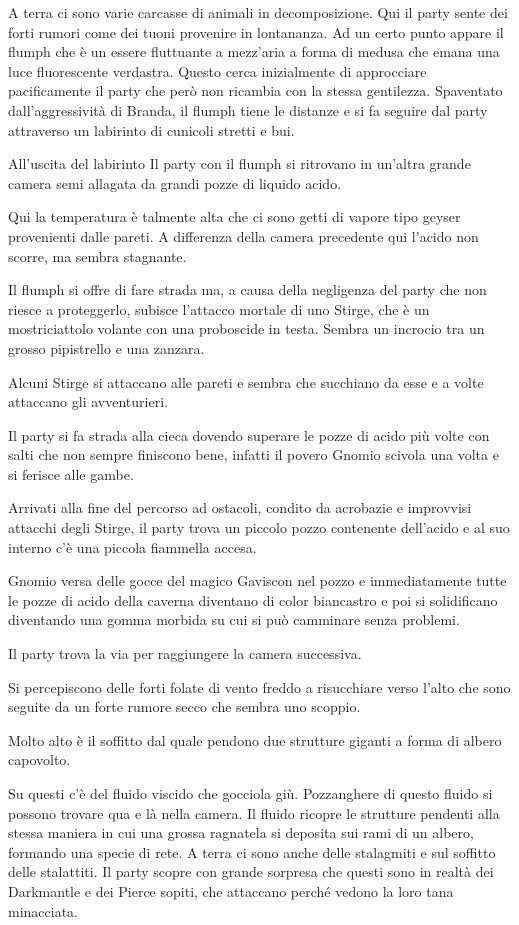 A terra ci sono varie carcasse di animali in decomposizione. Qui il
party sente dei forti rumori come dei tuoni provenire in lontananza. Ad
un certo punto appare il flumph che è un essere fluttuante a mezz'aria a
forma di medusa che emana una luce fluorescente verdastra. Questo cerca
inizialmente di approcciare pacificamente il party che però non ricambia
con la stessa gentilezza. Spaventato dall'aggressività di Branda, il
flumph tiene le distanze e si fa seguire dal party attraverso un
labirinto di cunicoli stretti e bui.

All'uscita del labirinto Il party con il flumph si ritrovano in un'altra
grande camera semi allagata da grandi pozze di liquido acido.

Qui la temperatura è talmente alta che ci sono getti di vapore tipo
geyser provenienti dalle pareti. A differenza della camera precedente
qui l'acido non scorre, ma sembra stagnante.

Il flumph si offre di fare strada ma, a causa della negligenza del party
che non riesce a proteggerlo, subisce l'attacco mortale di uno Stirge,
che è un mostriciattolo volante con una proboscide in testa. Sembra un
incrocio tra un grosso pipistrello e una zanzara.

Alcuni Stirge si attaccano alle pareti e sembra che succhiano da esse e
a volte attaccano gli avventurieri.

Il party si fa strada alla cieca dovendo superare le pozze di acido più
volte con salti che non sempre finiscono bene, infatti il povero Gnomio
scivola una volta e si ferisce alle gambe.

Arrivati alla fine del percorso ad ostacoli, condito da acrobazie e
improvvisi attacchi degli Stirge, il party trova un piccolo pozzo
contenente dell'acido e al suo interno c'è una piccola fiammella accesa.

Gnomio versa delle gocce del magico Gaviscon nel pozzo e immediatamente
tutte le pozze di acido della caverna diventano di color biancastro e
poi si solidificano diventando una gomma morbida su cui si può camminare
senza problemi.

Il party trova la via per raggiungere la camera successiva.

Si percepiscono delle forti folate di vento freddo a risucchiare verso
l'alto che sono seguite da un forte rumore secco che sembra uno scoppio.

Molto alto è il soffitto dal quale pendono due strutture giganti a forma
di albero capovolto.

Su questi c'è del fluido viscido che gocciola giù. Pozzanghere di questo
fluido si possono trovare qua e là nella camera. Il fluido ricopre le
strutture pendenti alla stessa maniera in cui una grossa ragnatela si
deposita sui rami di un albero, formando una specie di rete. A terra ci
sono anche delle stalagmiti e sul soffitto delle stalattiti. Il party
scopre con grande sorpresa che questi sono in realtà dei Darkmantle e
dei Pierce sopiti, che attaccano perché vedono la loro tana minacciata.

